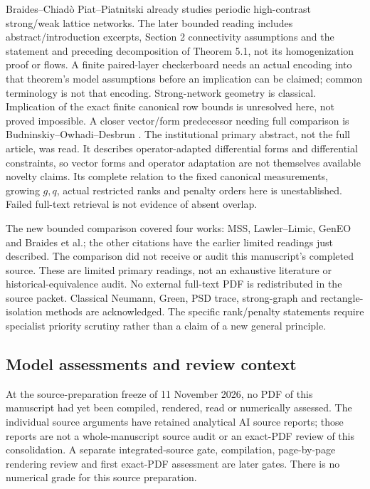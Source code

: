 Braides--Chiad\`o Piat--Piatnitski \cite{BCP} already studies periodic
high-contrast strong/weak lattice networks. The later bounded reading
includes abstract/introduction excerpts, Section 2 connectivity assumptions
and the statement and preceding decomposition of Theorem 5.1, not its
homogenization proof or flows. A finite paired-layer checkerboard needs an
actual encoding into that theorem's model assumptions before an implication
can be claimed; common terminology is not that encoding. Strong-network
geometry is classical. Implication of the exact finite canonical row bounds
is unresolved here, not proved impossible.
A closer vector/form predecessor needing full comparison is
Budninskiy--Owhadi--Desbrun \cite{BOD}. The institutional primary abstract,
not the full article, was read. It describes operator-adapted differential
forms and differential constraints, so vector forms and operator adaptation
are not themselves available novelty claims. Its complete relation to the
fixed canonical measurements, growing $g,q$, actual restricted ranks and
penalty orders here is unestablished. Failed full-text retrieval is not
evidence of absent overlap.

The new bounded comparison covered four works: MSS, Lawler--Limic, GenEO
and Braides et al.; the other citations have the earlier limited readings
just described. The comparison did not receive or audit this manuscript's
completed source. These are limited primary readings, not an exhaustive literature or
historical-equivalence audit. No external full-text PDF is redistributed in
the source packet. Classical Neumann, Green, PSD trace, strong-graph and
rectangle-isolation methods are acknowledged. The specific rank/penalty
statements require specialist priority scrutiny rather than a claim of a new
general principle.

\subsection*{Model assessments and review context}
At the source-preparation freeze of 11 November 2026, no PDF of this
manuscript had yet been compiled, rendered, read or numerically assessed.
The individual source arguments have retained analytical AI source reports;
those reports are not a whole-manuscript source audit or an exact-PDF review
of this consolidation. A separate integrated-source gate, compilation,
page-by-page rendering review and first exact-PDF assessment are later gates.
There is no numerical grade for this source preparation.

